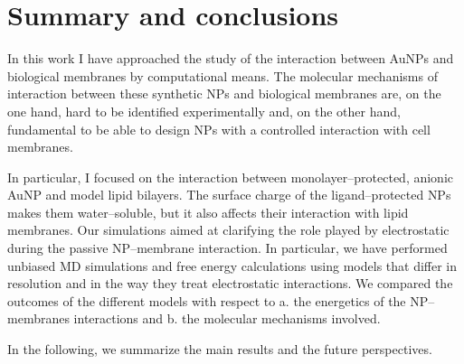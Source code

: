 \chapter{Summary and conclusions}
\label{chap:conclusions}
\begingroup
\toclesssection
\introductionStyle

%
%
In this work I have approached the study of the interaction between \acp{AuNP} and biological membranes by computational means. The molecular mechanisms of interaction between these synthetic \acp{NP} and biological membranes are, on the one hand, hard to be identified experimentally and, on the other hand, fundamental to be able to design \acp{NP} with a controlled interaction with cell membranes.

In particular, I focused on the interaction between monolayer--protected, anionic \ac{AuNP} and model lipid bilayers. The surface charge of the ligand--protected \ac{NP}s makes them water--soluble, but it also affects their interaction with lipid membranes. Our simulations aimed at clarifying the role played by electrostatic during the passive \ac{NP}--membrane interaction. In particular, we have performed unbiased \ac{MD} simulations and free energy calculations using models that differ in resolution and in the way they treat electrostatic interactions. We compared the outcomes of the different models with respect to a. the energetics of the \ac{NP}--membranes interactions and b. the molecular mechanisms involved.

In the following, we summarize the main results and the future perspectives.


